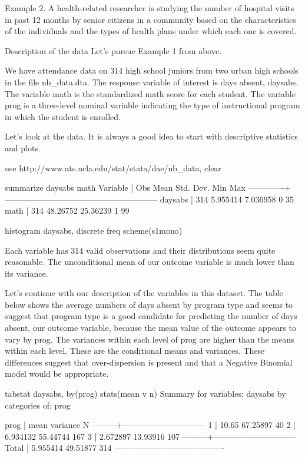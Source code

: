 Example 2.  A health-related researcher is studying the number of hospital visits in past 12 months by senior citizens in a community based on the characteristics of the individuals and the types of health plans under which each one is covered.  

Description of the data
Let's pursue Example 1 from above.

We have attendance data on 314 high school juniors from two urban high schools in the file nb_data.dta.  The response variable of interest is days absent, daysabs.  The variable math is the standardized math score for each student.  The variable prog is a three-level nominal variable indicating the type of instructional program in which the student is enrolled.

Let's look at the data.  It is always a good idea to start with descriptive statistics and plots.

use http://www.ats.ucla.edu/stat/stata/dae/nb_data, clear

summarize daysabs math
Variable |       Obs        Mean    Std. Dev.       Min        Max
-------------+--------------------------------------------------------
daysabs |       314    5.955414    7.036958          0         35
math |       314    48.26752    25.36239          1         99

histogram daysabs, discrete freq scheme(s1mono)



Each variable has 314 valid observations and their distributions seem quite reasonable. The unconditional mean of our outcome variable is much lower than its variance. 

Let's continue with our description of the variables in this dataset. The table below shows the average numbers of days absent by program type and seems to suggest that program type is a good candidate for predicting the number of days absent, our outcome variable, because the mean value of the outcome appears to vary by prog. The variances within each level of prog are higher than the means within each level. These are the conditional means and variances. These differences suggest that over-dispersion is present and that a Negative Binomial model would be appropriate. 

tabstat daysabs, by(prog) stats(mean v n)
Summary for variables: daysabs
by categories of: prog 

prog |      mean  variance         N
---------+------------------------------
1 |     10.65  67.25897        40
2 |  6.934132  55.44744       167
3 |  2.672897  13.93916       107
---------+------------------------------
Total |  5.955414  49.51877       314
----------------------------------------

